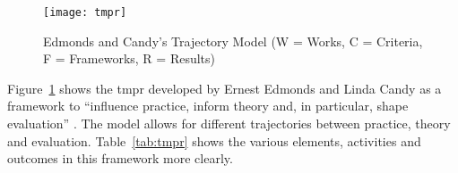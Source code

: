 


\begin{figure}[htb] %
  \centering
  \texttt{[image: tmpr]}
  \caption[Trajectory Model]{Edmonds and Candy's Trajectory Model (W = Works, C = Criteria, F = Frameworks, R = Results)}
\label{fig:tmpr}
\end{figure}

Figure~\ref{fig:tmpr} shows the \gls{tmpr} developed by Ernest Edmonds and Linda Candy as a framework to ``influence practice, inform theory and, in particular, shape evaluation'' \autocite{Edmonds2010}. The model allows for different trajectories between practice, theory and evaluation. Table~\ref{tab:tmpr} shows the various elements, activities and outcomes in this framework more clearly.

